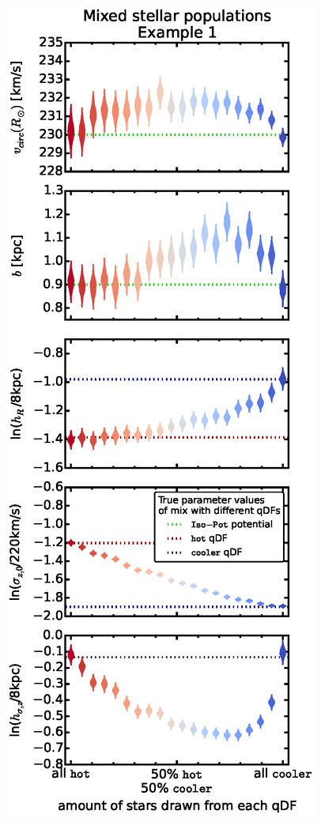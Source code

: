 \begin{figure}[!htbp]
\centering
\includegraphics[scale=0.45]{figs/isoSphFlexMixCont_violins_2.eps}

\end{figure}
